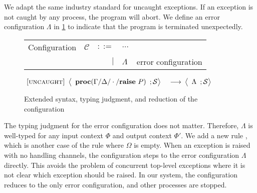 \documentclass[12pt, openany]{memoir}
\newcommand*{\craise}[1]{\textbf{raise}\ #1}
\newcommand*{\procObj}[4]{\textbf{proc}(#1/#2/#3/#4)}
\newcommand*{\config}[0]{\mathcal{C}}
\newcommand*{\cancelSet}[0]{\mathcal{S}}
\begin{document}
We adapt the same industry standard for uncaught exceptions. If an exception is not caught by any process,
the program will abort. We define an error configuration $\Lambda$ in \cref{fig:abortcfg} to indicate that the program is terminated unexpectedly.
\begin{figure}[H]
  \centering
  \begin{tabular}{r r r l l}
    Configuration & $\config$ & $::=$ & $\ldots$ &  \\
    & & $\mid$ & $\Lambda$ & error configuration
   \end{tabular}
   \begin{rules}
   \end{rules}
   \vspace*{-1cm}
   \begin{alignat}{4}
    \label{uncaught} \textsc{[uncaught]} & ~ 
    \Braket{
      \begin{array}{l}
        \procObj{\Gamma}{\Delta}{\cdot}{\craise{P}}
      \end{array}
      ; \cancelSet
    } & ~ \longrightarrow & ~ 
    \Braket{
      \begin{array}{l}
        \Lambda
      \end{array}
      ; \cancelSet
    } \tag*{}
  \end{alignat}
  \caption{Extended syntax, typing judgment, and reduction of the configuration}
  \label{fig:abortcfg}
\end{figure}
The typing judgment for the error configuration does not matter. Therefore, $\Lambda$ is well-typed for any input context $\Phi$ and output context $\Phi'$.
We add a new rule , which is another case of the  rule where $\Omega$ is empty.
When an exception is raised with no handling channels, the configuration steps to the error configuration $\Lambda$ directly.
This avoids the problem of concurrent top-level exceptions where it is not clear which exception should be raised.
In our system, the configuration reduces to the only error configuration, and other processes are stopped.
\end{document}
